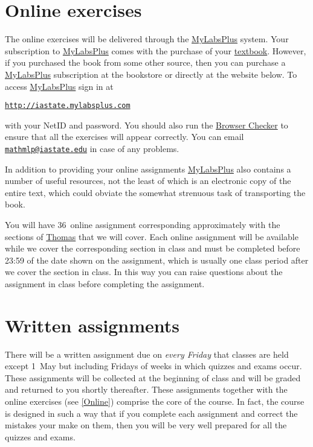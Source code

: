 \documentclass[11pt]{article}
\begin{document}
\section{Online exercises}\label{Online}
The online exercises will be delivered through the
\href{http://iastate.mylabsplus.com}{MyLabsPlus} system.
Your subscription to 
\href{http://iastate.mylabsplus.com}{MyLabsPlus}
comes with the purchase of your
\href{http://wps.aw.com/aw_thomas_calculus_series}{textbook}.
However, if you purchased the book from some other source,
then you can purchase a 
\href{http://iastate.mylabsplus.com}{MyLabsPlus}
subscription at the bookstore or directly at the website below.
To access
\href{http://iastate.mylabsplus.com}{MyLabsPlus}
sign in at
\begin{center}
\href{http://iastate.mylabsplus.com}{\tt http://iastate.mylabsplus.com}
\end{center}
with your NetID and password.
You should also run the
\href{https://www.mathxl.com/BrowserCheck/BrowserCheck.aspx?appproductid=3&courseid=2744761&handler_urn=pearson%2fmlp_mml_xl%2fslink%2fx-pearson-mlp_mml_xl&productid=ccng}{Browser Checker}
to ensure that all the exercises will appear correctly.
You can email \href{mailto://mathmlp@iastate.edu}{\tt mathmlp@iastate.edu}
in case of any problems.

In addition to providing your online assignments
\href{http://iastate.mylabsplus.com}{MyLabsPlus}
also contains a number of useful resources, not the least of which is an
electronic copy of the entire text, which could obviate
the somewhat strenuous task of transporting the book.

You will have 36~online assignment corresponding
approximately with the sections of 
\href{http://wps.aw.com/aw_thomas_calculus_series}{Thomas}
that we will cover. Each online assignment will be available while we cover the
corresponding section in class and must be completed
before 23:59 of the date shown on the assignment, which
is usually one class period after we cover the section in class.
In this way you can raise questions about
the assignment in class before completing the assignment.

\section{Written assignments}\label{Written}
There will be a written assignment due on {\em every 
Friday} that classes are held
except 1~May but including Fridays of weeks
in which quizzes and exams occur.
These assignments will be collected at the beginning
of class and will be graded and returned to you shortly thereafter.
These assignments together with the online exercises
(see \autoref{Online}) comprise the core of the course.
In fact, the course is 
designed in such a way that if you complete each assignment and 
correct the mistakes your make on them,
then you will be very well prepared for all the quizzes and exams.
\end{document}
